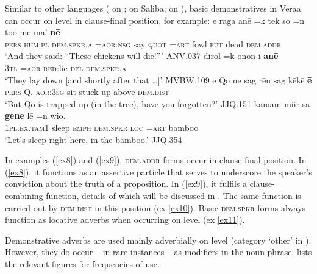\documentclass[output=paper
,modfonts
,nonflat]{langsci/langscibook}
\begin{document}
Similar to other  languages (\cite{Mosel2004} on ; \cite{Margetts2004} on Saliba; \cite{Francois2001} on ), basic demonstratives in Vera{\textquotesingle}a can occur on  level in clause-final position, for example:
\ea \label{ex8}
\gll		e 		raga 		an\=e		=k 		tek 	so				=n 	t\=oo 	me 	ma' 	\textbf{n\=e}		\\
		\textsc{pers}	\textsc{hum:pl}	\textsc{\textsc{dem.spkr.a}}	\textsc{=aor:nsg}	say	\textsc{quot}	\textsc{=art}	fowl	\textsc{fut}	dead	\textsc{dem.addr}	\\
\glt	`And they said: ``These chickens will die!'''			\hfill{ANV.037}
\z
\ea	\label{ex9}
\gll	dir{\textquotesingle}\=ol			=k 		\=on\=on 	{\textquotesingle}i 		\textbf{an\=e}		\\
		\textsc{3tl}	\textsc{=aor}	\textsc{red:}lie	\textsc{del}	\textsc{\textsc{dem.spkr.a}}	\\
\glt	`They lay down [and shortly after that \dots]'	\hfill{MVBW.109}
\z
\ea	\label{ex10}
\gll	e 		Qo{\textquotesingle} 	ne 			sag 	r\=en 		sag 	k\=ek\=e 		\textbf{\=e}	\\
		\textsc{pers}	Q.	\textsc{aor:3sg}	sit 		stuck		up		above		\textsc{dem.dist}			\\
\glt	`But Qo{\textquotesingle} is trapped up (in the tree), have you forgotten?'		\hfill{JJQ.151}
\z
\ea	\label{ex11}
\gll	kamam 			mi{\textquotesingle}ir 		sa 		\textbf{g\=en\=e} 		l\=e		=n 	wio.		\\
		\textsc{1pl.ex.tam1}		sleep		\textsc{emph}	\textsc{dem.spkr}	\textsc{loc}	\textsc{=art}	bamboo	\\
\glt	`Let’s sleep right here, in the bamboo.'			\hfill{JJQ.354}
\z

\noindent
In examples (\ref{ex8}) and (\ref{ex9}), \textsc{dem.addr} forms occur in clause-final position. In (\ref{ex8}), it functions as an assertive particle that serves to underscore the speaker's conviction about the truth of a proposition. In (\ref{ex9}), it fulfils a clause-combining function, details of which will be discussed in . The same function is carried out by \textsc{dem.dist} in this position (ex \ref{ex10}). Basic \textsc{dem.spkr} forms always function as locative adverbs when occurring on  level (ex \ref{ex11}).

Demonstrative adverbs are used mainly adverbially on  level (category `other' in ). However, they do occur -- in rare instances -- as modifiers in the noun phrase.  lists the relevant figures for frequencies of use.
\end{document}
